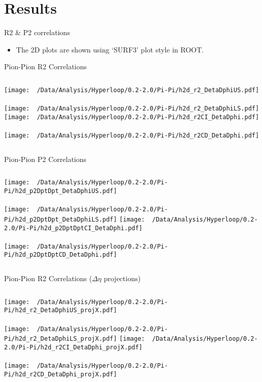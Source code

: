 \documentclass{beamer}
\begin{document}
\section{Results}
\begin{frame}{R2 \& P2 correlations}
	\begin{itemize}
		\item The 2D plots are shown using `SURF3' plot style in ROOT.
	\end{itemize}
\end{frame}
\begin{frame}{Pion-Pion R2 Correlations}
	\begin{columns}
		\centering
		\texttt{[image: ~/Data/Analysis/Hyperloop/0.2-2.0/Pi-Pi/h2d\_r2\_DetaDphiUS.pdf]}\\~\\
		\texttt{[image: ~/Data/Analysis/Hyperloop/0.2-2.0/Pi-Pi/h2d\_r2\_DetaDphiLS.pdf]}
		\centering
		\texttt{[image: ~/Data/Analysis/Hyperloop/0.2-2.0/Pi-Pi/h2d\_r2CI\_DetaDphi.pdf]}\\~\\
		\texttt{[image: ~/Data/Analysis/Hyperloop/0.2-2.0/Pi-Pi/h2d\_r2CD\_DetaDphi.pdf]}
	\end{columns}
\end{frame}
\begin{frame}{Pion-Pion P2 Correlations}
	\begin{columns}
		\column{0.5\linewidth}
		\centering
		\texttt{[image: ~/Data/Analysis/Hyperloop/0.2-2.0/Pi-Pi/h2d\_p2DptDpt\_DetaDphiUS.pdf]}\\~\\
		\texttt{[image: ~/Data/Analysis/Hyperloop/0.2-2.0/Pi-Pi/h2d\_p2DptDpt\_DetaDphiLS.pdf]}
		\column{0.5\linewidth}
		\centering
		\texttt{[image: ~/Data/Analysis/Hyperloop/0.2-2.0/Pi-Pi/h2d\_p2DptDptCI\_DetaDphi.pdf]}\\~\\
		\texttt{[image: ~/Data/Analysis/Hyperloop/0.2-2.0/Pi-Pi/h2d\_p2DptDptCD\_DetaDphi.pdf]}
	\end{columns}
\end{frame}
\begin{frame}{Pion-Pion R2 Correlations ($\Delta\eta$ projections)}
	\begin{columns}
		\centering
		\texttt{[image: ~/Data/Analysis/Hyperloop/0.2-2.0/Pi-Pi/h2d\_r2\_DetaDphiUS\_projX.pdf]}\\~\\
		\texttt{[image: ~/Data/Analysis/Hyperloop/0.2-2.0/Pi-Pi/h2d\_r2\_DetaDphiLS\_projX.pdf]}
		\centering
		\texttt{[image: ~/Data/Analysis/Hyperloop/0.2-2.0/Pi-Pi/h2d\_r2CI\_DetaDphi\_projX.pdf]}\\~\\
		\texttt{[image: ~/Data/Analysis/Hyperloop/0.2-2.0/Pi-Pi/h2d\_r2CD\_DetaDphi\_projX.pdf]}
	\end{columns}
\end{frame}
\end{document}
